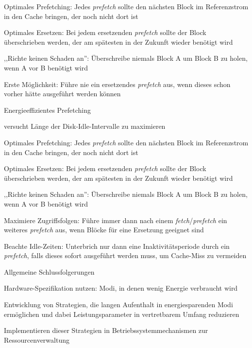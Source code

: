 \documentclass[a4paper]{article}
\begin{document}
\begin{multicols}{3}
\begin{itemize*}
\begin{itemize*}
\begin{itemize*}
            \end{itemize*}
        \end{itemize*}
            \begin{enumerate*}
                \item Optimales Prefetching: Jedes \emph{prefetch} sollte den nächsten Block im Referenzstrom in den Cache bringen, der noch nicht dort ist
                \item Optimales Ersetzen: Bei jedem ersetzenden \emph{prefetch} sollte der Block überschrieben werden, der am spätesten in der Zukunft wieder benötigt wird
                \item ,,Richte keinen Schaden an'': Überschreibe niemals Block A um Block B zu holen, wenn A vor B benötigt wird
                \item Erste Möglichkeit: Führe nie ein ersetzendes \emph{prefetch} aus, wenn dieses schon vorher hätte ausgeführt werden können
            \end{enumerate*}
        \item Energieeffizientes Prefetching
        \begin{itemize*}
            \item versucht Länge der Disk-Idle-Intervalle zu maximieren
        \end{itemize*}
            \begin{enumerate*}
                \item Optimales Prefetching: Jedes \emph{prefetch} sollte den nächsten Block im Referenzstrom in den Cache bringen, der noch nicht dort ist
                \item Optimales Ersetzen: Bei jedem ersetzenden \emph{prefetch} sollte der Block überschrieben werden, der am spätesten in der Zukunft wieder benötigt wird
                \item ,,Richte keinen Schaden an'': Überschreibe niemals Block A um Block B zu holen, wenn A vor B benötigt wird
                \item Maximiere Zugriffsfolgen: Führe immer dann nach einem \emph{fetch}/\emph{prefetch} ein weiteres \emph{prefetch} aus, wenn Blöcke für eine Ersetzung geeignet sind
                \item Beachte Idle-Zeiten: Unterbrich nur dann eine Inaktivitätsperiode durch ein \emph{prefetch}, falls dieses sofort ausgeführt werden muss, um Cache-Miss zu vermeiden
            \end{enumerate*}
    \end{itemize*}
    Allgemeine Schlussfolgerungen
    \begin{enumerate*}
        \item Hardware-Spezifikation nutzen: Modi, in denen wenig Energie verbraucht wird
        \item Entwicklung von Strategien, die langen Aufenthalt in energiesparenden Modi ermöglichen und dabei Leistungsparameter in vertretbarem Umfang reduzieren
        \item Implementieren dieser Strategien in Betriebssystemmechanismen zur Ressourcenverwaltung
    \end{enumerate*}


\end{multicols}
\end{document}
